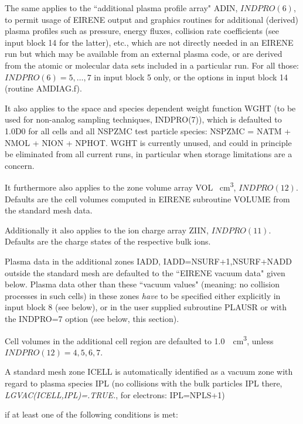 \medskip

The same applies to the ``additional plasma profile array" ADIN, $INDPRO(6)$,
to permit usage of EIRENE output and graphics routines for additional (derived)
plasma profiles such as pressure, energy fluxes, collision rate coefficients
(see input block 14 for the latter), etc., which are not directly needed in an
EIRENE run but which may be available from an external plasma code, or are
derived from the atomic or molecular data sets included in a particular run.
For all those: $INDPRO(6) = 5, \dots, 7$ in input block 5 only, or the options
in input block 14 (routine AMDIAG.f).

It also applies to the space and species dependent weight function WGHT (to be
used for non-analog sampling techniques, INDPRO(7)), which is defaulted to
1.0D0 for all cells and all NSPZMC test particle species:
NSPZMC = NATM + NMOL + NION + NPHOT.
WGHT is currently unused, and could in principle be eliminated from all current
runs, in particular when storage limitations are a concern.

It furthermore also applies to the zone volume array VOL
\si{\per\cubic\centi\metre}, $INDPRO(12)$.
Defaults are the cell volumes computed in EIRENE subroutine VOLUME from the
standard mesh data.

Additionally it also applies to the ion charge array ZIIN, $INDPRO(11)$.
Defaults are the charge states of the respective bulk ions.

Plasma data in the additional zones IADD, IADD=NSURF+1,NSURF+NADD outside the
standard mesh are defaulted to the ``EIRENE vacuum data" given below.
Plasma data other than these ``vacuum values" (meaning: no collision processes
in such cells) in these zones \textsl{have} to be specified either explicitly
in input block 8 (see below), or in the user supplied subroutine PLAUSR or with
the INDPRO=7 option (see below, this section).

Cell volumes in the additional cell region are defaulted to
\SI{1.0}{\per\cubic\centi\metre}, unless $INDPRO(12)=4, 5, 6, 7$.

A standard mesh zone ICELL is automatically identified as a vacuum zone with
regard to plasma species IPL (no collisions with the bulk particles IPL there,
\emph{LGVAC(ICELL,IPL)=.TRUE.}, for electrons: IPL=NPLS+1)

if at least one of the following conditions is met:

